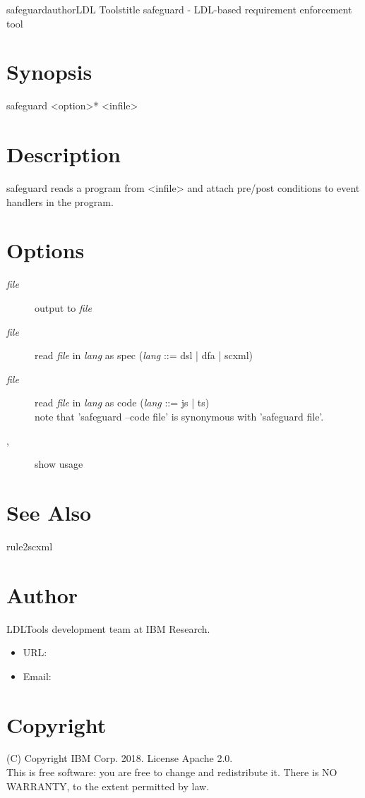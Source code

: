 \documentclass[fancy]{article}
\begin{document}
\begin{Name}{1}{safeguard}{author}{LDL Tools}{title}
safeguard - LDL-based requirement enforcement tool
\end{Name}

\section{Synopsis}
safeguard <option>* <infile>

\section{Description}
safeguard reads a program from <infile>
and attach pre/post conditions to event handlers in the program.

\section{Options}

\begin{description}
\item[ \emph{file}]
  output to \emph{file}
\item[ \emph{file}]
  read \emph{file} in \emph{lang} as spec (\emph{lang} ::= dsl | dfa | scxml)
\item[ \emph{file}]
  read \emph{file} in \emph{lang} as code (\emph{lang} ::= js | ts)\\
  note that 'safeguard --code file' is synonymous with 'safeguard file'.
%
\item[, ]
  show usage

\end{description}

\section{See Also}
rule2scxml

\section{Author}
LDLTools development team at IBM Research.

\begin{itemize}
\item URL: 
\item Email: 
\end{itemize}

\section{Copyright}
(C) Copyright IBM Corp. 2018.
License Apache 2.0.\\

This is free software: you are free to change and redistribute it.
There is NO  WARRANTY,  to the extent permitted by law.
\end{document}
